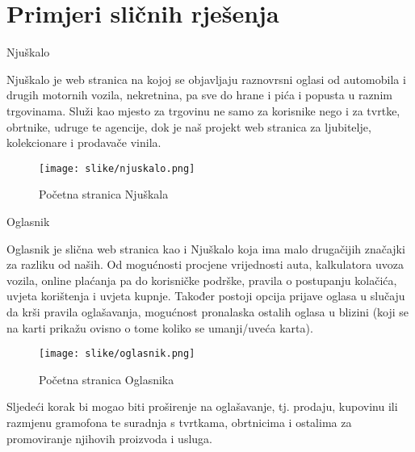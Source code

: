 	 
	 \section {Primjeri sličnih rješenja}
	 
	 \item[] \begin{packed_enum}
	 		\item Njuškalo
	 		
	 		\text Njuškalo je web stranica na kojoj se objavljaju raznovrsni oglasi od automobila i drugih motornih vozila,  nekretnina, pa sve do hrane i pića i popusta u raznim trgovinama. Služi kao mjesto za trgovinu ne samo za korisnike nego i za tvrtke, obrtnike, udruge te agencije, dok je naš projekt web stranica za ljubitelje, kolekcionare i prodavače vinila.\\
	 		
	 		\begin{figure}[H]
	 			\texttt{[image: slike/njuskalo.png]}
	 			\centering
	 			\caption{Početna stranica Njuškala}
	 			\label{fig:njuškalo}
	 		\end{figure}
	 		
	 		
		 	\item Oglasnik
	 		
	 		\text Oglasnik je slična web stranica kao i Njuškalo koja ima malo drugačijih značajki za razliku od naših. Od mogućnosti procjene vrijednosti auta, kalkulatora uvoza vozila, online plaćanja pa do korisničke podrške, pravila o postupanju kolačića, uvjeta korištenja i uvjeta kupnje. Također postoji opcija prijave oglasa u slučaju da krši pravila oglašavanja, mogućnost pronalaska ostalih oglasa u blizini (koji se na karti prikažu ovisno o tome koliko se umanji/uveća karta). \\
	 		
	 		\begin{figure}[H]
	 			\texttt{[image: slike/oglasnik.png]}
	 			\centering
	 			\caption{Početna stranica Oglasnika}
	 			\label{fig:oglasnik}
	 		\end{figure}
	 		
	 	\end{packed_enum}
	 		
	 		\text Sljedeći korak bi mogao biti proširenje na oglašavanje, tj. prodaju, kupovinu ili razmjenu gramofona te suradnja s tvrtkama, obrtnicima i ostalima za promoviranje njihovih proizvoda i usluga.
	 		